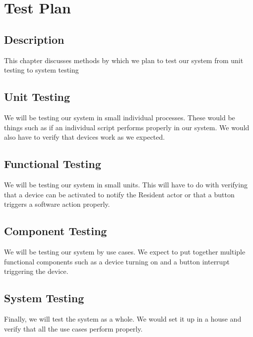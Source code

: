 \chapter{Test Plan}

\section{Description}
This chapter discusses methods by which we plan to test our system from unit testing to system testing

\section{Unit Testing}
We will be testing our system in small individual processes. These would be things such as if an individual script performs properly in our system. We would also have to verify that devices work as we expected.

\section{Functional Testing}
We will be testing our system in small units. This will have to do with verifying that a device can be activated to notify the Resident actor or that a button triggers a software action properly.

\section{Component Testing}
We will be testing our system by use cases. We expect to put together multiple functional components such as a device turning on and a button interrupt triggering the device.

\section{System Testing}
Finally, we will test the system as a whole. We would set it up in a house and verify that all the use cases perform properly.